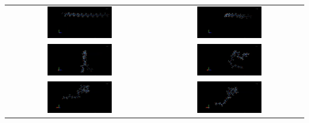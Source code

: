 \documentclass[12pt]{article}
\begin{document}
    \begin{table}[h]
        \centering
        \begin{tabular}{cc}
        \includegraphics[width=0.45\textwidth]{figures/ap1.png}
        &         
        \includegraphics[width=0.45\textwidth]{figures/ap2.png} \\  
        \includegraphics[width=0.45\textwidth]{figures/ap3.png}
        &         
        \includegraphics[width=0.45\textwidth]{figures/ap4.png}\\
        \includegraphics[width=0.45\textwidth]{figures/ap6.png}
        &         
        \includegraphics[width=0.45\textwidth]{figures/ap7.png}\\

\end{tabular}
\end{table}
\end{document}
